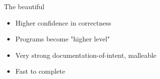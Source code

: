 \documentclass[xcolor = {dvipsnames, table}]{beamer}
\begin{document}
\begin{frame}
    \begin{block}{The beautiful}
        \begin{itemize}
            \item Higher confidence in correctness
            \item Programs become "higher level"
            \item Very strong documentation-of-intent, malleable
            \item Fast to complete
        \end{itemize}
    \end{block}
\end{frame}
\end{document}
